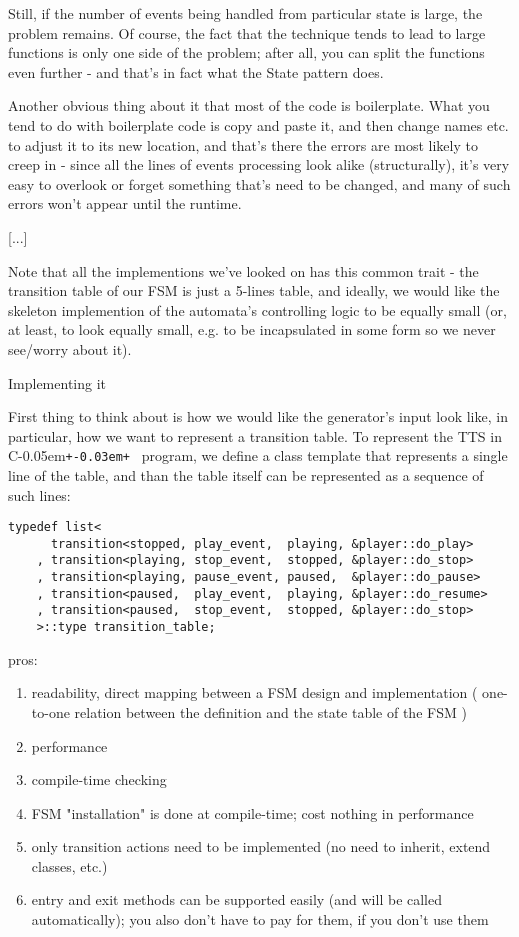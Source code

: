 \documentclass{netobjectdays}
\newcommand{\Cpp}{C\kern-0.05em\texttt{+\kern-0.03em+}%
}
\begin{document}
Still, if the number of events being handled from particular 
state is large, the problem remains. Of course, the fact that 
the technique tends to lead to large functions is only one 
side of the problem; after all, you can split the functions 
even further - and that's in fact what the State pattern does.

Another obvious thing about it that most of the code is 
boilerplate. What you tend to do with boilerplate code is copy 
and paste it, and then change names etc. to adjust it to its new 
location, and that's there the errors are most likely to creep in
- since all the lines of events processing look alike 
(structurally), it's very easy to overlook or forget something 
that's need to be changed, and many of such errors won't appear 
until the runtime.

[...]

Note that all the implementions we've looked on has this common 
trait - the transition table of our FSM is just a 5-lines table, 
and ideally, we would like the skeleton implemention of the 
automata's controlling logic to be equally small (or, at least, 
to look equally small, e.g. to be incapsulated in some form so 
we never see/worry about it). 

Implementing it

First thing to think about is how we would like the generator's 
input look like, in particular, how we want to represent a 
transition table. To represent the TTS in \Cpp\ program, we define 
a  class template that represents a single line 
of the table, and than the table itself can be represented as a 
sequence of such lines:

{\footnotesize
\begin{verbatim}
typedef list<
      transition<stopped, play_event,  playing, &player::do_play>
    , transition<playing, stop_event,  stopped, &player::do_stop>
    , transition<playing, pause_event, paused,  &player::do_pause>
    , transition<paused,  play_event,  playing, &player::do_resume>
    , transition<paused,  stop_event,  stopped, &player::do_stop>
    >::type transition_table;
\end{verbatim}
}

pros:
\begin{enumerate}
\item readability, direct mapping between a FSM design and 
    implementation ( one-to-one relation between the 
    definition and the state table of the FSM )
\item performance %
\item compile-time checking 
\item FSM "installation" is done at compile-time; cost 
    nothing in performance 
\item only transition actions need to be implemented 
    (no need to inherit, extend classes, etc.) 
\item entry and exit methods can be supported easily 
    (and will be called automatically); you also don't have 
    to pay for them, if you don't use them 
\end{enumerate}
\end{document}
